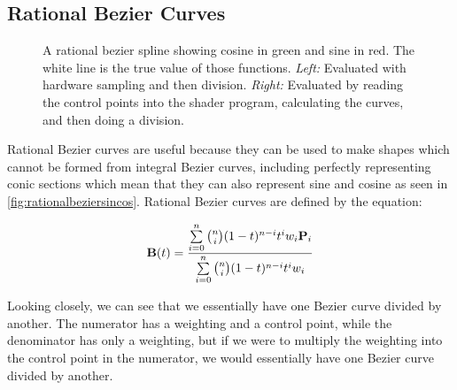 \documentclass{jcgt}
\begin{document}
\subsection{Rational Bezier Curves}

\begin{figure}

    \caption{A rational bezier spline showing cosine in green and sine in red.  The white line is the true value of those functions. \textit{Left:} Evaluated with hardware sampling and then division.  \textit{Right:} Evaluated by reading the control points into the shader program, calculating the curves, and then doing a division.}
    \label{fig:rationalbeziersincos}
  \end{figure}

Rational Bezier curves are useful because they can be used to make shapes which cannot be formed from integral Bezier curves, including perfectly representing conic sections which mean that they can also represent sine and cosine as seen in \autoref{fig:rationalbeziersincos}.  Rational Bezier curves are defined by the equation:

\begin{equation}
\text{\bf{B}}(t) = \frac
                {\sum\limits_{i=0}^n\binom {n} {i}(1-t)^{n-i}t^iw_i\text{\bf{P}}_i}
                {\sum\limits_{i=0}^n\binom {n} {i}(1-t)^{n-i}t^iw_i}
\label{eqn:rationalbezier}                
\end{equation}

Looking closely, we can see that we essentially have one Bezier curve divided by another.  The numerator has a weighting and a control point, while the denominator has only a weighting, but if we were to multiply the weighting into the control point in the numerator, we would essentially have one Bezier curve divided by another.
\end{document}
